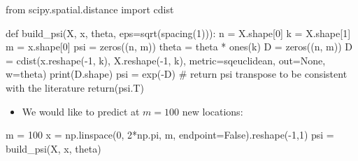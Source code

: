 \documentclass[
  letterpaper,
  DIV=11,
  numbers=noendperiod]{scrreprt}
\newenvironment{Shaded}{\begin{snugshade}}{\end{snugshade}}
\newcommand{\BuiltInTok}[1]{\textcolor[rgb]{0.00,0.23,0.31}{#1}}
\newcommand{\CommentTok}[1]{\textcolor[rgb]{0.37,0.37,0.37}{#1}}
\newcommand{\ControlFlowTok}[1]{\textcolor[rgb]{0.00,0.23,0.31}{#1}}
\newcommand{\DecValTok}[1]{\textcolor[rgb]{0.68,0.00,0.00}{#1}}
\newcommand{\ImportTok}[1]{\textcolor[rgb]{0.00,0.46,0.62}{#1}}
\newcommand{\KeywordTok}[1]{\textcolor[rgb]{0.00,0.23,0.31}{#1}}
\newcommand{\NormalTok}[1]{\textcolor[rgb]{0.00,0.23,0.31}{#1}}
\newcommand{\OperatorTok}[1]{\textcolor[rgb]{0.37,0.37,0.37}{#1}}
\newcommand{\StringTok}[1]{\textcolor[rgb]{0.13,0.47,0.30}{#1}}
\newcommand{\VariableTok}[1]{\textcolor[rgb]{0.07,0.07,0.07}{#1}}
\providecommand{\tightlist}{%
  \setlength{\itemsep}{0pt}\setlength{\parskip}{0pt}}\usepackage{longtable,booktabs,array}
\begin{document}
\begin{Shaded}
\begin{Highlighting}[]
\ImportTok{from}\NormalTok{ scipy.spatial.distance }\ImportTok{import}\NormalTok{ cdist}

\KeywordTok{def}\NormalTok{ build\_psi(X, x, theta, eps}\OperatorTok{=}\NormalTok{sqrt(spacing(}\DecValTok{1}\NormalTok{))):}
\NormalTok{    n }\OperatorTok{=}\NormalTok{ X.shape[}\DecValTok{0}\NormalTok{]}
\NormalTok{    k }\OperatorTok{=}\NormalTok{ X.shape[}\DecValTok{1}\NormalTok{]}
\NormalTok{    m }\OperatorTok{=}\NormalTok{ x.shape[}\DecValTok{0}\NormalTok{]}
\NormalTok{    psi }\OperatorTok{=}\NormalTok{ zeros((n, m))}
\NormalTok{    theta }\OperatorTok{=}\NormalTok{ theta }\OperatorTok{*}\NormalTok{ ones(k)}
\NormalTok{    D }\OperatorTok{=}\NormalTok{ zeros((n, m))}
\NormalTok{    D }\OperatorTok{=}\NormalTok{ cdist(x.reshape(}\OperatorTok{{-}}\DecValTok{1}\NormalTok{, k),}
\NormalTok{              X.reshape(}\OperatorTok{{-}}\DecValTok{1}\NormalTok{, k),}
\NormalTok{              metric}\OperatorTok{=}\StringTok{\textquotesingle{}sqeuclidean\textquotesingle{}}\NormalTok{,}
\NormalTok{              out}\OperatorTok{=}\VariableTok{None}\NormalTok{,}
\NormalTok{              w}\OperatorTok{=}\NormalTok{theta)}
    \BuiltInTok{print}\NormalTok{(D.shape)}
\NormalTok{    psi }\OperatorTok{=}\NormalTok{ exp(}\OperatorTok{{-}}\NormalTok{D)}
    \CommentTok{\# return psi transpose to be consistent with the literature}
    \ControlFlowTok{return}\NormalTok{(psi.T)}
\end{Highlighting}
\end{Shaded}

\begin{itemize}
\tightlist
\item
  We would like to predict at \(m = 100\) new locations:
\end{itemize}

\begin{Shaded}
\begin{Highlighting}[]
\NormalTok{m }\OperatorTok{=} \DecValTok{100}
\NormalTok{x }\OperatorTok{=}\NormalTok{ np.linspace(}\DecValTok{0}\NormalTok{, }\DecValTok{2}\OperatorTok{*}\NormalTok{np.pi, m, endpoint}\OperatorTok{=}\VariableTok{False}\NormalTok{).reshape(}\OperatorTok{{-}}\DecValTok{1}\NormalTok{,}\DecValTok{1}\NormalTok{)}
\NormalTok{psi }\OperatorTok{=}\NormalTok{ build\_psi(X, x, theta)}
\end{Highlighting}
\end{Shaded}
\end{document}
